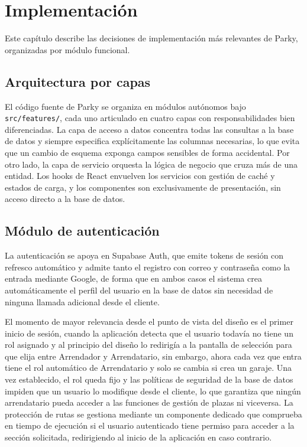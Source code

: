 \chapter{Implementación}
\label{ch:implementacion}

Este capítulo describe las decisiones de implementación más relevantes de Parky, organizadas por módulo funcional.

\section{Arquitectura por capas}
\label{sec:arquitectura_capas}

El código fuente de Parky se organiza en módulos autónomos bajo \texttt{src/features/}, cada uno articulado en cuatro capas con responsabilidades bien diferenciadas. La capa de acceso a datos concentra todas las consultas a la base de datos y siempre especifica explícitamente las columnas necesarias, lo que evita que un cambio de esquema exponga campos sensibles de forma accidental. Por otro lado, la capa de servicio orquesta la lógica de negocio que cruza más de una entidad. Los hooks de React envuelven los servicios con gestión de caché y estados de carga, y los componentes son exclusivamente de presentación, sin acceso directo a la base de datos.

\section{Módulo de autenticación}
\label{sec:impl_auth}

La autenticación se apoya en Supabase Auth, que emite tokens de sesión con refresco automático y admite tanto el registro con correo y contraseña como la entrada mediante Google, de forma que en ambos casos el sistema crea automáticamente el perfil del usuario en la base de datos sin necesidad de ninguna llamada adicional desde el cliente.

El momento de mayor relevancia desde el punto de vista del diseño es el primer inicio de sesión, cuando la aplicación detecta que el usuario todavía no tiene un rol asignado y al principio del diseño lo redirigía a la pantalla de selección para que elija entre Arrendador y Arrendatario, sin embargo, ahora cada vez que entra tiene el rol automático de Arrendatario y solo se cambia si crea un garaje. Una vez establecido, el rol queda fijo y las políticas de seguridad de la base de datos impiden que un usuario lo modifique desde el cliente, lo que garantiza que ningún arrendatario pueda acceder a las funciones de gestión de plazas ni viceversa. La protección de rutas se gestiona mediante un componente dedicado que comprueba en tiempo de ejecución si el usuario autenticado tiene permiso para acceder a la sección solicitada, redirigiendo al inicio de la aplicación en caso contrario.


